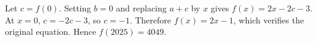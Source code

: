 Let $c=f(0)$. Setting $b=0$ and replacing $a+c$ by $x$ gives $f(x)=2x-2c-3$. At $x=0$, $c=-2c-3$, so $c=-1$. Therefore $f(x)=2x-1$, which verifies the original equation. Hence $\boxed{f(2025)=4049}$.

